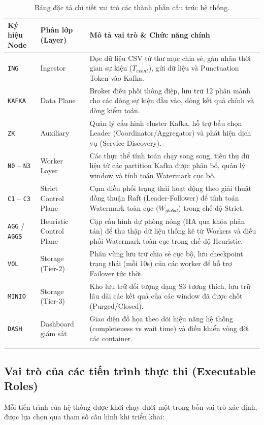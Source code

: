 \documentclass[12pt,a4paper]{article}
\begin{document}
\begin{longtable}{p{} p{} p{}}
\toprule
\textbf{Ký hiệu Node} & \textbf{Phân lớp (Layer)} & \textbf{Mô tả vai trò \& Chức năng chính} \\
\midrule
\endhead
\texttt{ING} & Ingestor & Đọc dữ liệu CSV từ thư mục chia sẻ, gán nhãn thời gian sự kiện ($T_{event}$), gửi dữ liệu và Punctuation Token vào Kafka. \\
\texttt{KAFKA} & Data Plane & Broker điều phối thông điệp, lưu trữ 12 phân mảnh cho các dòng sự kiện đầu vào, dòng kết quả chính và dòng kiểm toán. \\
\texttt{ZK} & Auxiliary & Quản lý cấu hình cluster Kafka, hỗ trợ bầu chọn Leader (Coordinator/Aggregator) và phát hiện dịch vụ (Service Discovery). \\
\texttt{N0} -- \texttt{N3} & Worker Layer & Các thực thể tính toán chạy song song, tiêu thụ dữ liệu từ các partition Kafka được phân bổ, quản lý window và tính toán Watermark cục bộ. \\
\texttt{C1} -- \texttt{C3} & Strict Control Plane & Cụm điều phối trạng thái hoạt động theo giải thuật đồng thuận Raft (Leader-Follower) để tính toán Watermark toàn cục ($W_{global}$) trong chế độ Strict. \\
\texttt{AGG} / \texttt{AGGS} & Heuristic Control Plane & Cặp cấu hình dự phòng nóng (HA qua khóa phân tán) để thu thập dữ liệu thống kê từ Workers và điều phối Watermark toàn cục trong chế độ Heuristic. \\
\texttt{VOL} & Storage (Tier-2) & Phân vùng lưu trữ chia sẻ cục bộ, lưu checkpoint trạng thái (mỗi 10s) của các worker để hỗ trợ Failover tức thời. \\
\texttt{MINIO} & Storage (Tier-3) & Kho lưu trữ đối tượng dạng S3 tương thích, lưu trữ lâu dài các kết quả của các window đã được chốt (Purged/Closed). \\
\texttt{DASH} & Dashboard giám sát & Giao diện đồ họa theo dõi hiệu năng hệ thống (completeness vs wait time) và điều khiển vòng đời các container. \\
\bottomrule
\caption{Bảng đặc tả chi tiết vai trò các thành phần cấu trúc hệ thống.}
\end{longtable}

\subsection{Vai trò của các tiến trình thực thi (Executable Roles)}
Mỗi tiến trình của hệ thống được khởi chạy dưới một trong bốn vai trò xác định, được lựa chọn qua tham số cấu hình khi triển khai:
\end{document}
